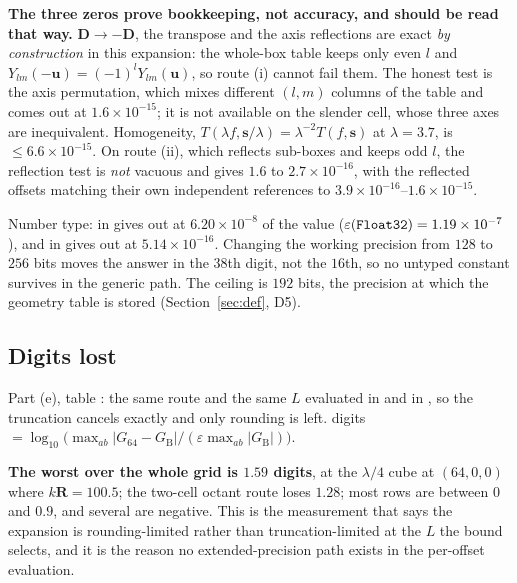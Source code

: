\noindent
\textbf{The three zeros prove bookkeeping, not accuracy, and should be read that way.}
$\mathbf{D}\to-\mathbf{D}$, the transpose and the axis reflections are exact \emph{by
construction} in this expansion: the whole-box table keeps only even $l$ and
$Y_{lm}(-\mathbf{u}) = (-1)^lY_{lm}(\mathbf{u})$, so route (i) cannot fail them. The honest
test is the axis permutation, which mixes different $(l,m)$ columns of the table and comes
out at $1.6\times10^{-15}$; it is not available on the slender cell, whose three axes are
inequivalent. Homogeneity, $T(\lambda f, \mathbf{s}/\lambda) = \lambda^{-2}T(f,\mathbf{s})$
at $\lambda = 3.7$, is $\le 6.6\times10^{-15}$. On route (ii), which reflects sub-boxes and
keeps odd $l$, the reflection test is \emph{not} vacuous and gives $1.6$ to
$2.7\times10^{-16}$, with the reflected offsets matching their own independent references to
$3.9\times10^{-16}$--$1.6\times10^{-15}$.

Number type:  in gives  out at $6.20\times10^{-8}$ of the
 value ($\varepsilon(\texttt{Float32}) = 1.19\times10^{-7}$), and
 in gives  out at $5.14\times10^{-16}$.
Changing the working precision from $128$ to $256$ bits moves the answer in the $38$th
digit, not the $16$th, so no untyped constant survives in the generic path. The ceiling is
$192$ bits, the precision at which the geometry table is stored
(Section~\ref{sec:def}, D5).

\subsection{Digits lost}
\label{sec:ver:dig}

Part (e), table : the same route and the same $L$ evaluated in
 and in , so the truncation cancels exactly and only
rounding is left. digits $=
\log_{10}\bigl(\max_{ab}|G_{64}-G_{\mathrm{B}}|/(\varepsilon\max_{ab}|G_{\mathrm{B}}|)\bigr)$.

\begin{center}\footnotesize

\end{center}

\noindent
\textbf{The worst over the whole grid is $1.59$ digits}, at the $\lambda/4$ cube at
$(64,0,0)$ where $k\mathbf{R} = 100.5$; the two-cell octant route loses $1.28$; most rows
are between $0$ and $0.9$, and several are negative. This is the measurement that says the
expansion is rounding-limited rather than truncation-limited at the $L$ the bound selects,
and it is the reason no extended-precision path exists in the per-offset evaluation.

